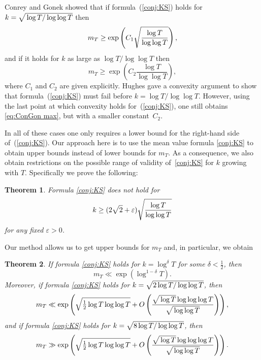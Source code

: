 \documentclass[10pt,reqno,twoside]{amsart}
\newtheorem{theorem}{Theorem}[section]
\numberwithin{equation}{section}
\numberwithin{theorem}{section}
\begin{document}
{{Conrey and Gonek showed that if formula~(\ref{conj:KS}) holds
for $k=\sqrt{\mathstrut \log T/ \log\log T}$ then
\begin{equation}\label{eq:ConGon max1}
m_T \geq \exp\left(C_1 \sqrt{\mathstrut \frac{\log
T}{\log\log T}}\right),
\end{equation}
and if it holds for $k$ as large as $\log T/ \log\log T$
then
\begin{equation}\label{eq:ConGon max}
m_T \geq \exp\left(C_2 \frac{\log
T}{\log\log T}\right) ,
\end{equation}
where $C_1$ and $C_2$ are given explicitly.
Hughes \cite{Hug} gave a convexity argument to show that
formula~(\ref{conj:KS}) must fail before $k=\log T/ \log\log T$.
However, using the last point at which convexity holds
for~(\ref{conj:KS}), one still obtains \eqref{eq:ConGon max},
but with a smaller constant~$C_2$.

In all of these cases one only requires  a lower bound for
the right-hand side of~(\ref{conj:KS}).
Our approach here is to use the mean value formula \eqref{conj:KS} to
obtain upper bounds instead of lower bounds for $m_T$.
As a consequence, we  also obtain restrictions on the
possible range of validity of~\eqref{conj:KS} for $k$ growing with $T$.
Specifically we prove the following:
\begin{theorem} \label{thm:KS fails}
Formula \eqref{conj:KS} does not hold for
\begin{equation}
k\geq (2\sqrt{\mathstrut 2}+\varepsilon) \sqrt{\mathstrut
\frac{\log T}{\log\log T}}
\end{equation}
for any fixed $\varepsilon >0$.
\end{theorem}

Our method allows us to get upper bounds for $m_T$ and,
in particular,  we obtain
\begin{theorem} \label{thm:max size zeta}
If formula \eqref{conj:KS} holds for
$k=\log^\delta T$ for some $\delta<\frac12$, then
\begin{equation}
m_T \ll \exp\left( \log^{1-\delta} T \right) .
\end{equation}
Moreover, if formula \eqref{conj:KS} holds for
$k=\sqrt{\mathstrut 2\log T/\log\log T}$, then
\begin{equation}
m_T \ll \exp\left(  \sqrt{\mathstrut \tfrac12 \log T \log\log T} +
O\left(\frac{\sqrt{\mathstrut \log T} \log\log\log T}{\sqrt{\mathstrut \log\log
T}}\right)\right) ,
\end{equation}
and if formula \eqref{conj:KS} holds for $k=\sqrt{\mathstrut 8\log
T/\log\log T}$, then
\begin{equation}
m_T \gg \exp\left( \sqrt{\mathstrut \tfrac12 \log T \log\log T} +
O\left(\frac{\sqrt{\mathstrut \log T} \log\log\log T}{\sqrt{\mathstrut \log\log
T}}\right)\right) .
\end{equation}
\end{theorem}

}}
\end{document}
